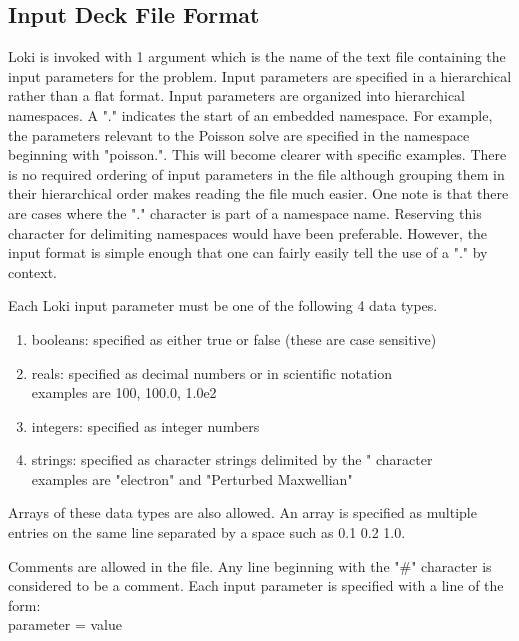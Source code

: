 \documentclass[11pt]{amsart}
\begin{document}
\subsection*{Input Deck File Format}
Loki is invoked with 1 argument which is the name of the text file containing
the input parameters for the problem.  Input parameters are specified in a
hierarchical rather than a flat format.  Input parameters are organized into
hierarchical namespaces.  A "." indicates the start of an embedded namespace.
For example, the parameters relevant to the Poisson solve are specified in the
namespace beginning with "poisson.".  This will become clearer with specific
examples.  There is no required ordering of input parameters in the file
although grouping them in their hierarchical order makes reading the file much
easier.  One note is that there are cases where the "." character is part of a
namespace name.  Reserving this character for delimiting namespaces would have
been preferable.  However, the input format is simple enough that one can
fairly easily tell the use of a "." by context.

Each Loki input parameter must be one of the following 4 data types.
\begin{enumerate}
\item booleans: specified as either true or false (these are case sensitive)
\item reals: specified as decimal numbers or in scientific notation \\
       examples are 100, 100.0, 1.0e2
\item integers: specified as integer numbers
\item strings: specified as character strings delimited by the " character \\
         examples are "electron" and "Perturbed Maxwellian"
\end{enumerate}
Arrays of these data types are also allowed.  An array is specified as multiple
entries on the same line separated by a space such as 0.1 0.2 1.0.

Comments are allowed in the file.  Any line beginning with the "\#" character
is considered to be a comment.  Each input parameter is specified with a line
of the form: \\
parameter = value
\end{document}
